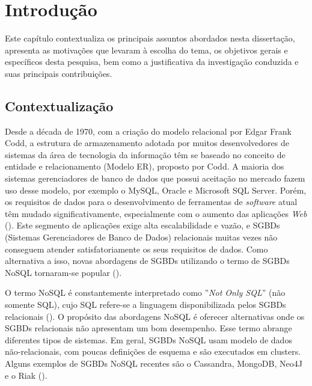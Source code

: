 
\chapter{Introdução}
\label{chp:introduction}


\noindent Este capítulo contextualiza os principais assuntos abordados nesta dissertação, apresenta as motivações que levaram à escolha do tema, os objetivos gerais e específicos desta pesquisa, bem como a justificativa da investigação conduzida e suas principais contribuições.
\clearpage


\section{Contextualização}

Desde a década de 1970, com a criação do modelo relacional por Edgar Frank Codd, a estrutura de armazenamento adotada por muitos desenvolvedores de sistemas da área de tecnologia da informação têm se baseado no conceito de entidade e relacionamento (Modelo ER), proposto por Codd. A maioria dos sistemas gerenciadores de banco de dados que possui aceitação no mercado fazem uso desse modelo, por exemplo o MySQL, Oracle e Microsoft SQL Server. Porém, os requisitos de dados para o desenvolvimento de ferramentas de \textit{software} atual têm mudado significativamente, especialmente com o aumento das aplicações \textit{Web} (\cite{nasholm:2012}). Este segmento de aplicações exige alta escalabilidade e vazão, e SGBDs (Sistemas Gerenciadores de Banco de Dados) relacionais muitas vezes não conseguem atender satisfatoriamente os seus requisitos de dados. Como alternativa a isso, novas abordagens de SGBDs utilizando o termo de SGBDs NoSQL tornaram-se popular (\cite{silva:2016}).

O termo NoSQL é constantemente interpretado como ''\emph{Not Only SQL}'' (não somente SQL), cujo SQL refere-se a linguagem disponibilizada pelos SGBDs relacionais (\cite{nasholm:2012}). O propósito das abordagens NoSQL é oferecer alternativas onde os SGBDs relacionais não apresentam um bom desempenho. Esse termo abrange diferentes tipos de sistemas. Em geral, SGBDs NoSQL usam modelo de dados não-relacionais, com poucas definições de esquema e são executados em clusters. Alguns exemplos de SGBDs NoSQL recentes são o Cassandra, MongoDB, Neo4J e o Riak (\cite{fowler:2013}).

